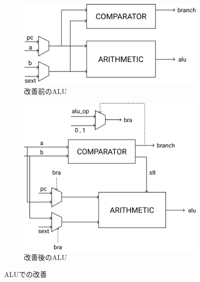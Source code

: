 \documentclass[../main.tex]{subfiles}
\begin{document}
        \begin{figure}[h]
            \centering
            \begin{subfigure}{\columnwidth}
                \centering
                \includegraphics[width = 1.3\columnwidth]{../images/old_alu.png}
                \caption{改善前のALU}
                \label{fig:aluBefore}
            \end{subfigure}
            \begin{subfigure}{\columnwidth}
                \centering
                \includegraphics[width = 1.3\columnwidth]{../images/new_alu.jpg}
                \caption{改善後のALU}
                \label{fig:aluAfter}
            \end{subfigure}
            \caption{ALUでの改善}
            \label{fig:aluImprove}
        \end{figure}
\end{document}
